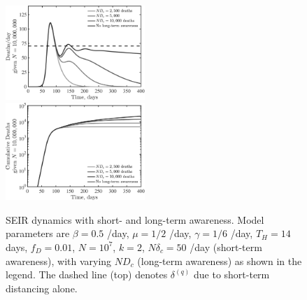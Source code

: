 \begin{figure}[t!]
\begin{center}
\includegraphics[width=0.47\textwidth]{scripts/figseir_Hlong_k2D_noname.pdf}\\
\includegraphics[width=0.47\textwidth]{scripts/figseir_Hlong_k2Dtot_noname.pdf}\\
\caption{SEIR dynamics with short- and long-term awareness.
Model parameters are $\beta=0.5$ /day, $\mu=1/2$ /day, $\gamma=1/6$ /day,
$T_H=14$ days, $f_D=0.01$, $N=10^7$, $k=2$, $N\delta_c=50$ /day (short-term
awareness), with varying $ND_c$ (long-term awareness) as shown in the legend.
The dashed line (top) denotes $\delta^{(q)}$ due to short-term
distancing alone.
\label{fig.longterm}}
\end{center}
\end{figure}

